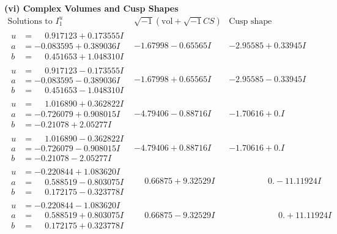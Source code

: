 \documentclass[1p]{elsarticle_modified}
\theoremstyle{definition}
\newcommand{\I}{\sqrt{-1}}
\begin{document}
\newpage\flushleft \textbf{(vi) Complex Volumes and Cusp Shapes}
$$\begin{array}{c|c|c}  
\text{Solutions to }I^u_{1}& \I (\text{vol} + \sqrt{-1}CS) & \text{Cusp shape}\\
 \hline 
\begin{aligned}
u &= \phantom{-}0.917123 + 0.173555 I \\
a &= -0.083595 + 0.389036 I \\
b &= \phantom{-}0.451653 + 1.048310 I\end{aligned}
 & -1.67998 - 0.65565 I & -2.95585 + 0.33945 I \\ \hline\begin{aligned}
u &= \phantom{-}0.917123 - 0.173555 I \\
a &= -0.083595 - 0.389036 I \\
b &= \phantom{-}0.451653 - 1.048310 I\end{aligned}
 & -1.67998 + 0.65565 I & -2.95585 - 0.33945 I \\ \hline\begin{aligned}
u &= \phantom{-}1.016890 + 0.362822 I \\
a &= -0.726079 + 0.908015 I \\
b &= -0.21078 + 2.05277 I\end{aligned}
 & -4.79406 - 0.88716 I & -1.70616 + 0. I\phantom{ +0.000000I} \\ \hline\begin{aligned}
u &= \phantom{-}1.016890 - 0.362822 I \\
a &= -0.726079 - 0.908015 I \\
b &= -0.21078 - 2.05277 I\end{aligned}
 & -4.79406 + 0.88716 I & -1.70616 + 0. I\phantom{ +0.000000I} \\ \hline\begin{aligned}
u &= -0.220844 + 1.083620 I \\
a &= \phantom{-}0.588519 - 0.803075 I \\
b &= \phantom{-}0.172175 - 0.323778 I\end{aligned}
 & \phantom{-}0.66875 + 9.32529 I & \phantom{-0.000000 } 0. - 11.11924 I \\ \hline\begin{aligned}
u &= -0.220844 - 1.083620 I \\
a &= \phantom{-}0.588519 + 0.803075 I \\
b &= \phantom{-}0.172175 + 0.323778 I\end{aligned}
 & \phantom{-}0.66875 - 9.32529 I & \phantom{-0.000000 -}0. + 11.11924 I \\ \hline\begin{aligned}

\end{aligned}
\end{array}$$
\end{document}

